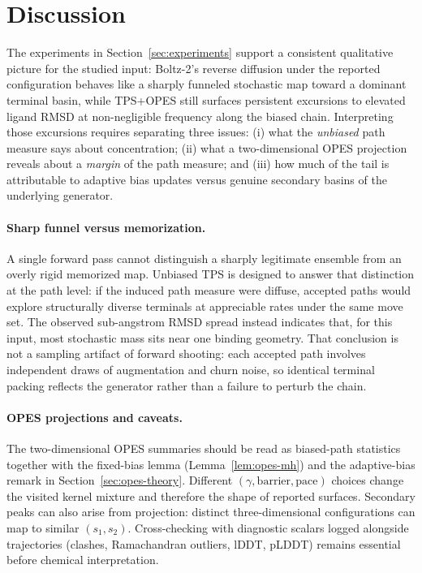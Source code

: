 \section{Discussion}
\label{sec:discussion}

The experiments in Section~\ref{sec:experiments} support a consistent
qualitative picture for the studied input: Boltz-2's reverse diffusion under
the reported configuration behaves like a sharply funneled stochastic map
toward a dominant terminal basin, while TPS+OPES still surfaces persistent
excursions to elevated ligand RMSD at non-negligible frequency along the biased
chain. Interpreting those excursions requires separating three issues: (i) what
the \emph{unbiased} path measure says about concentration; (ii) what a
two-dimensional OPES projection reveals about a \emph{margin} of the path
measure; and (iii) how much of the tail is attributable to adaptive bias updates
versus genuine secondary basins of the underlying generator.

\paragraph{Sharp funnel versus memorization.}
A single forward pass cannot distinguish a sharply legitimate ensemble from an
overly rigid memorized map. Unbiased TPS is designed to answer that distinction
at the path level: if the induced path measure were diffuse, accepted paths
would explore structurally diverse terminals at appreciable rates under the
same move set. The observed sub-angstrom RMSD spread instead indicates that,
for this input, most stochastic mass sits near one binding geometry. That
conclusion is not a sampling artifact of forward shooting: each accepted path
involves independent draws of augmentation and churn noise, so identical
terminal packing reflects the generator rather than a failure to perturb the
chain.

\paragraph{OPES projections and caveats.}
The two-dimensional OPES summaries should be read as biased-path statistics
together with the fixed-bias lemma (Lemma~\ref{lem:opes-mh}) and the adaptive-bias
remark in Section~\ref{sec:opes-theory}. Different $(\gamma, \mathrm{barrier},
\mathrm{pace})$ choices change the visited kernel mixture and therefore the
shape of reported surfaces. Secondary peaks can also arise from projection:
distinct three-dimensional configurations can map to similar $(s_1,s_2)$.
Cross-checking with diagnostic scalars logged alongside trajectories (clashes,
Ramachandran outliers, lDDT, pLDDT) remains essential before chemical
interpretation.

